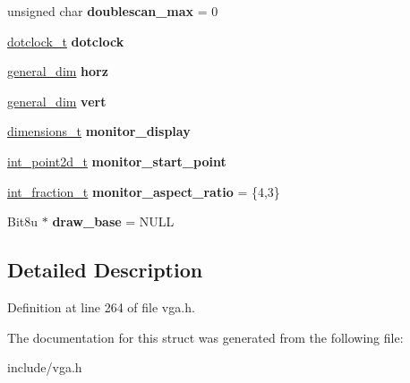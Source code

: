 \begin{DoxyCompactItemize}
\item 
\hypertarget{structVGA__Experimental__Model__1__t_af10c3ffeeef3e83cbac5aec0d1186cd2}{unsigned char {\bfseries doublescan\-\_\-max} = 0}\label{structVGA__Experimental__Model__1__t_af10c3ffeeef3e83cbac5aec0d1186cd2}

\item 
\hypertarget{structVGA__Experimental__Model__1__t_a5eb22970494f927d1a924425fc4b1fc8}{\hyperlink{structVGA__Experimental__Model__1__t_1_1dotclock__t}{dotclock\-\_\-t} {\bfseries dotclock}}\label{structVGA__Experimental__Model__1__t_a5eb22970494f927d1a924425fc4b1fc8}

\item 
\hypertarget{structVGA__Experimental__Model__1__t_a0481edac6912b263a94b468d914170a1}{\hyperlink{structVGA__Experimental__Model__1__t_1_1general__dim}{general\-\_\-dim} {\bfseries horz}}\label{structVGA__Experimental__Model__1__t_a0481edac6912b263a94b468d914170a1}

\item 
\hypertarget{structVGA__Experimental__Model__1__t_a181cfb53aa43128892588cd90817b37d}{\hyperlink{structVGA__Experimental__Model__1__t_1_1general__dim}{general\-\_\-dim} {\bfseries vert}}\label{structVGA__Experimental__Model__1__t_a181cfb53aa43128892588cd90817b37d}

\item 
\hypertarget{structVGA__Experimental__Model__1__t_ad77ab1c48e03b9042d12b1e1e32df1df}{\hyperlink{structVGA__Experimental__Model__1__t_1_1dimensions__t}{dimensions\-\_\-t} {\bfseries monitor\-\_\-display}}\label{structVGA__Experimental__Model__1__t_ad77ab1c48e03b9042d12b1e1e32df1df}

\item 
\hypertarget{structVGA__Experimental__Model__1__t_afb06918adc610eabebbb004b0b1647f6}{\hyperlink{structVGA__Experimental__Model__1__t_1_1int__point2d__t}{int\-\_\-point2d\-\_\-t} {\bfseries monitor\-\_\-start\-\_\-point}}\label{structVGA__Experimental__Model__1__t_afb06918adc610eabebbb004b0b1647f6}

\item 
\hypertarget{structVGA__Experimental__Model__1__t_ae8d2aa4cf1a889f862eb74fa54954f7c}{\hyperlink{structVGA__Experimental__Model__1__t_1_1int__fraction__t}{int\-\_\-fraction\-\_\-t} {\bfseries monitor\-\_\-aspect\-\_\-ratio} = \{4,3\}}\label{structVGA__Experimental__Model__1__t_ae8d2aa4cf1a889f862eb74fa54954f7c}

\item 
\hypertarget{structVGA__Experimental__Model__1__t_a3feebd9f1b31c065e3c5dfc8a4ea9fec}{Bit8u $\ast$ {\bfseries draw\-\_\-base} = N\-U\-L\-L}\label{structVGA__Experimental__Model__1__t_a3feebd9f1b31c065e3c5dfc8a4ea9fec}

\end{DoxyCompactItemize}


\subsection{Detailed Description}


Definition at line 264 of file vga.\-h.



The documentation for this struct was generated from the following file\-:\begin{DoxyCompactItemize}
\item 
include/vga.\-h\end{DoxyCompactItemize}
